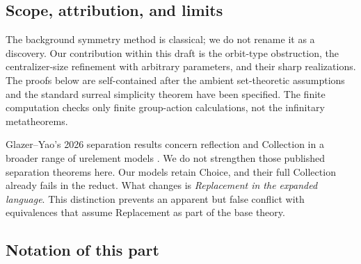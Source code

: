 \documentclass[11pt,letterpaper]{article}
\theoremstyle{definition}
\theoremstyle{remark}
\begin{document}
\subsection{Scope, attribution, and limits}
The background symmetry method is classical; we do not rename it as a discovery. Our contribution within this draft is the orbit-type obstruction, the centralizer-size refinement with arbitrary parameters, and their sharp realizations. The proofs below are self-contained after the ambient set-theoretic assumptions and the standard surreal simplicity theorem have been specified. The finite computation checks only finite group-action calculations, not the infinitary metatheorems.

Glazer--Yao's 2026 separation results concern reflection and Collection in a broader range of urelement models \cite{GlazerYao}. We do not strengthen those published separation theorems here. Our models retain Choice, and their full Collection already fails in the reduct. What changes is \emph{Replacement in the expanded language}. This distinction prevents an apparent but false conflict with equivalences that assume Replacement as part of the base theory.


\subsection{Notation of this part}
\label{hset:ns:sub:notation}
\end{document}
